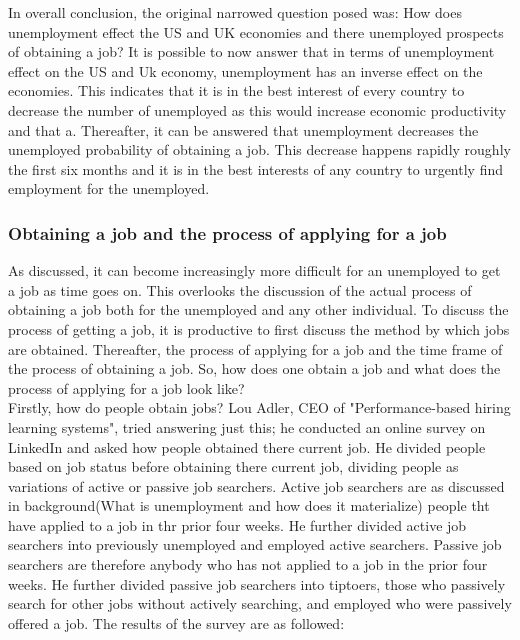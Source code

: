In overall conclusion, the original narrowed question posed was:
How does unemployment effect the US and UK economies and there unemployed prospects of obtaining a job?
It is possible to now answer that in terms of unemployment effect on the US and Uk economy, unemployment has an inverse effect on the economies.
This indicates that it is in the best interest of every country to decrease the number of unemployed as this would increase economic productivity and that a.
Thereafter, it can be answered that unemployment decreases the unemployed probability of obtaining a job.
This decrease happens rapidly roughly the first six months and it is in the best interests of any country to urgently find employment for the unemployed. \\

\subsubsection{Obtaining a job and the process of applying for a job}
As discussed, it can become increasingly more difficult for an unemployed to get a job as time goes on.
This overlooks the discussion of the actual process of obtaining a job both for the unemployed and any other individual.
To discuss the process of getting a job, it is productive to first discuss the method by which jobs are obtained.
Thereafter, the process of applying for a job and the time frame of the process of obtaining a job.
So, how does one obtain a job and what does the process of applying for a job look like? \\

Firstly, how do people obtain jobs?
Lou Adler, CEO of "Performance-based hiring learning systems", tried answering just this; he conducted an online survey on LinkedIn and asked how people obtained there current job.
He divided people based on job status before obtaining there current job, dividing people as variations of active or passive job searchers.
Active job searchers are as discussed in background(What is unemployment and how does it materialize) people tht have applied to a job in thr prior four weeks.
He further divided active job searchers into previously unemployed and employed active searchers.
Passive job searchers are therefore anybody who has not applied to a job in the prior four weeks.
He further divided passive job searchers into tiptoers, those who passively search for other jobs without actively searching, and employed who were passively offered a job.
The results of the survey are as followed: \\

